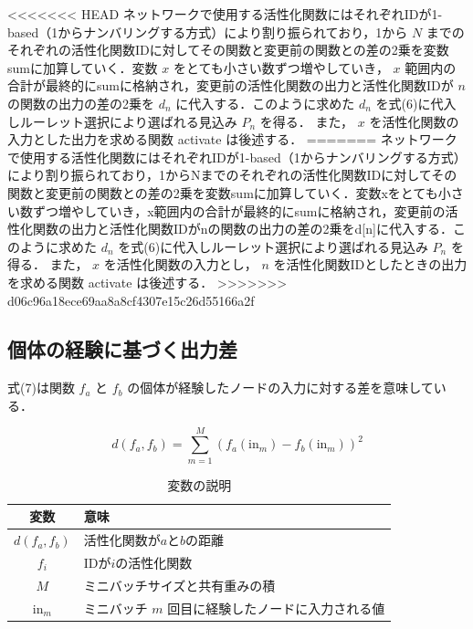 <<<<<<< HEAD
ネットワークで使用する活性化関数にはそれぞれIDが1-based（1からナンバリングする方式）により割り振られており，1から $ N $ までのそれぞれの活性化関数IDに対してその関数と変更前の関数との差の2乗を変数sumに加算していく．変数 $ x $ をとても小さい数ずつ増やしていき， $ x $ 範囲内の合計が最終的にsumに格納され，変更前の活性化関数の出力と活性化関数IDが $ n $ の関数の出力の差の2乗を $ d_n $ に代入する．このように求めた $ d_n $ を式(6)に代入しルーレット選択により選ばれる見込み $ P_n $ を得る．
また， $ x $ を活性化関数の入力とした出力を求める関数 activate は後述する．
=======
ネットワークで使用する活性化関数にはそれぞれIDが1-based（1からナンバリングする方式）により割り振られており，1からNまでのそれぞれの活性化関数IDに対してその関数と変更前の関数との差の2乗を変数sumに加算していく．変数xをとても小さい数ずつ増やしていき，x範囲内の合計が最終的にsumに格納され，変更前の活性化関数の出力と活性化関数IDがnの関数の出力の差の2乗をd[n]に代入する．このように求めた $ d_n $ を式(6)に代入しルーレット選択により選ばれる見込み $ P_n $ を得る．
また， $ x $ を活性化関数の入力とし， $ n $ を活性化関数IDとしたときの出力を求める関数 activate は後述する．
>>>>>>> d06c96a18ece69aa8a8cf4307e15c26d55166a2f

\subsection{個体の経験に基づく出力差}
式(7)は関数 $ f_a $ と $ f_b $ の個体が経験したノードの入力に対する差を意味している．

\begin{equation}
    d(f_{a}, f_{b}) = \sum_{m=1}^{M}(f_{a}(\text{in}_{m}) - f_{b}(\text{in}_{m}))^2
\end{equation}

\begin{table}[H]
    \caption{変数の説明}
    \centering
    \begin{tabular}{cl}
        \hline
        変数  & 意味 \\
        \hline \hline
        $d(f_{a}, f_{b})$ & 活性化関数が$a$と$b$の距離                 \\
        $f_{i}$           & IDが$i$の活性化関数                        \\
        $M$               & ミニバッチサイズと共有重みの積             \\
        $\text{in}_m$     & ミニバッチ $m$ 回目に経験したノードに入力される値 \\
        \hline
    \end{tabular}
\end{table}

